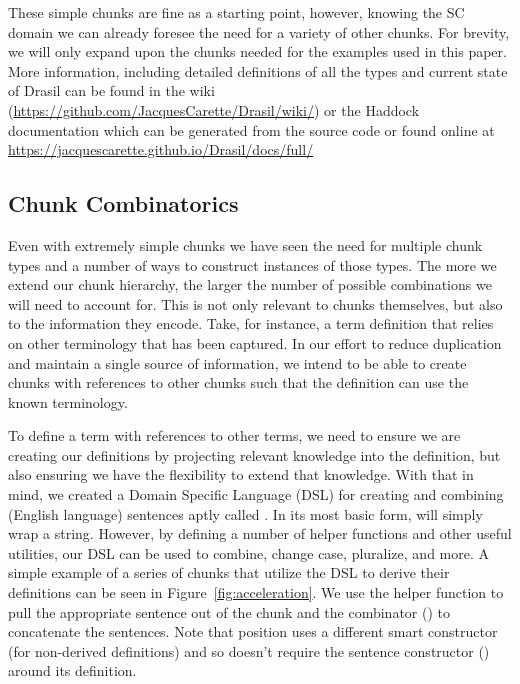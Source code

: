 
These simple chunks are fine as a starting point, however, knowing the SC domain we can 
already foresee the need for a variety of other chunks. For brevity, we will only expand 
upon the chunks needed for the examples used in this paper. More information, including 
detailed definitions of all the types and current state of Drasil can be found in the wiki 
(\href{https://github.com/JacquesCarette/Drasil/wiki/}
{https://github.com/JacquesCarette/Drasil/wiki/})
 or the Haddock documentation which can be generated from the source code or found online at 
\href{https://jacquescarette.github.io/Drasil/docs/full/}
{https://jacquescarette.github.io/Drasil/docs/full/}

\subsection{Chunk Combinatorics}

Even with extremely simple chunks we have seen the need for multiple chunk types and a 
number of ways to construct instances of those types. The more we extend our chunk 
hierarchy, the larger the number of possible combinations we will need to account for. This 
is not only relevant to chunks themselves, but also to the information they encode. Take, 
for instance, a term definition that relies on other terminology that has been captured. In 
our effort to reduce duplication and maintain a single source of information, we intend to 
be able to create chunks with references to other chunks such that the definition can use 
the known terminology.

To define a term with references to other terms, we need to ensure we are creating our 
definitions by projecting relevant knowledge into the definition, but also ensuring we have
the flexibility to extend that knowledge. With that in mind, we created a Domain Specific 
Language (DSL) for creating and combining (English language) sentences aptly called 
. In its most basic form,  will simply wrap a string. 
However, by defining a number of helper functions and other useful utilities, our 
 DSL can be used to combine, change case, pluralize, and more. A simple 
example of a series of chunks that utilize the  DSL to derive their 
definitions can be seen in Figure~\ref{fig:acceleration}. We use the  helper 
function to pull the appropriate sentence out of the  chunk and the 
combinator (\codeH{+:+}) to concatenate the sentences. Note that position uses a different 
smart constructor (for non-derived definitions) and so doesn't require the sentence 
constructor () around its definition.

